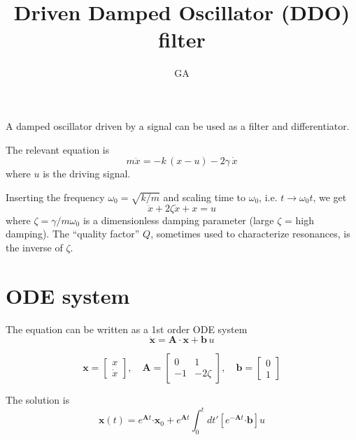 \documentclass[11pt,a4paper]{article}
\author{GA}
\title{Driven Damped Oscillator (DDO) filter}
\begin{document}
\maketitle

A damped oscillator driven by a signal can be used as a filter and differentiator.
 
The relevant equation is
\begin{equation}\label{key}
m\ddot{x} = -k\,(x-u) - 2\gamma\, \dot{x}
\end{equation}	
where $u$ is the driving signal.

Inserting the frequency $\omega_0 = \sqrt{k/m}$ and scaling time to $\omega_0$, i.e. $t \rightarrow \omega_0 t$, we get
\begin{equation}\label{key}
\ddot{x} + 2 \zeta \dot{x}  + x = u 
\end{equation}	
where $\zeta = \gamma / m\omega_0$ is a dimensionless damping parameter (large $\zeta$ = high damping). The ``quality factor'' $Q$, sometimes used to characterize resonances, is the inverse of $\zeta$.

\section{ODE system}

The equation can be written as a 1st order ODE system 
\begin{equation}
\dot{\mathbf{x}} = \mathbf{A \cdot x} + \mathbf{b}\,u
\end{equation}

\begin{equation}
\mathbf{x} =
\left[\begin{matrix}
x \\
\dot{x}
\end{matrix}\right],
\quad
\mathbf{A} =
\left[\begin{matrix}
0 & 1 \\
-1 & -2\zeta
\end{matrix}\right],
\quad
\mathbf{b} =
\left[\begin{matrix}
0 \\
1
\end{matrix}\right]
\end{equation}

The solution is
\begin{equation}
\mathbf{x}(t) = e^{\mathbf{A}t}\mathbf{\cdot x}_0 + 
e^{\mathbf{A}t} \int_0^t dt' 
\left[e^{-\mathbf{A}t}\mathbf{\cdot b}\right] u
\end{equation}
\end{document}
